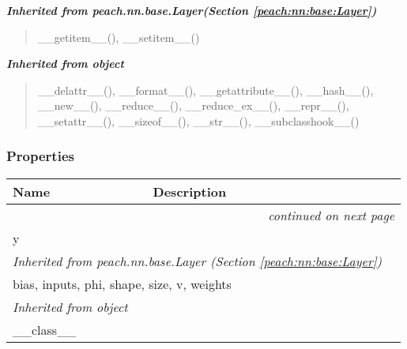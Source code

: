\large{\textbf{\textit{Inherited from peach.nn.base.Layer\textit{(Section \ref{peach:nn:base:Layer})}}}}

\begin{quote}
\_\_getitem\_\_(), \_\_setitem\_\_()
\end{quote}

\large{\textbf{\textit{Inherited from object}}}

\begin{quote}
\_\_delattr\_\_(), \_\_format\_\_(), \_\_getattribute\_\_(), \_\_hash\_\_(), \_\_new\_\_(), \_\_reduce\_\_(), \_\_reduce\_ex\_\_(), \_\_repr\_\_(), \_\_setattr\_\_(), \_\_sizeof\_\_(), \_\_str\_\_(), \_\_subclasshook\_\_()
\end{quote}


  \subsubsection{Properties}

    \vspace{-1cm}
\hspace{\varindent}\begin{longtable}{|p{\varnamewidth}|p{\vardescrwidth}|l}
\cline{1-2}
\cline{1-2} \centering \textbf{Name} & \centering \textbf{Description}& \\
\cline{1-2}
\endhead\cline{1-2}\multicolumn{3}{r}{\small\textit{continued on next page}}\\\endfoot\cline{1-2}
\endlastfoot\raggedright y\- & &\\
\cline{1-2}
\multicolumn{2}{|l|}{\textit{Inherited from peach.nn.base.Layer \textit{(Section \ref{peach:nn:base:Layer})}}}\\
\multicolumn{2}{|p{\varwidth}|}{\raggedright bias, inputs, phi, shape, size, v, weights}\\
\cline{1-2}
\multicolumn{2}{|l|}{\textit{Inherited from object}}\\
\multicolumn{2}{|p{\varwidth}|}{\raggedright \_\_class\_\_}\\
\cline{1-2}
\end{longtable}


